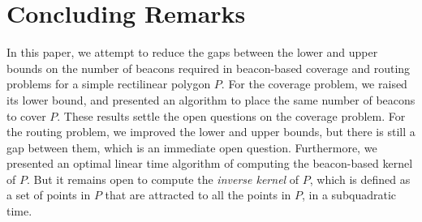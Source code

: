 \documentclass[11pt]{article}
\theoremstyle{definition}
\begin{document}
\section{Concluding Remarks} \label{sec:conclusion}


In this paper, we attempt to reduce the gaps between the lower and upper bounds on the number of beacons required in beacon-based coverage and routing problems for a simple rectilinear polygon $P$. For the coverage problem, we raised its lower bound, and presented an algorithm to place the same number of beacons to cover $P$. These results settle the open questions on the coverage problem. For the routing problem, we improved the lower and upper bounds, but there is still a gap between them, which is an immediate open question. Furthermore, we presented an optimal linear time algorithm of computing the beacon-based kernel of $P$. But it remains open to compute the \emph{inverse kernel} of $P$, which is defined as a set of points in $P$ that are attracted to all the points in $P$, in a subquadratic time.
\end{document}
